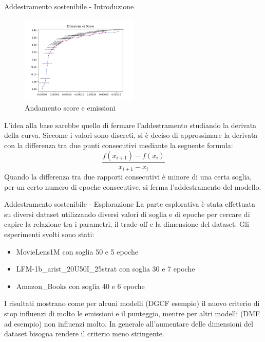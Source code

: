 

\begin{frame}{Addestramento sostenibile - Introduzione}
    \begin{figure}
        \centering
        \includegraphics[width=0.5\textwidth]{images/curve_emissions_score.png}
        \caption{Andamento score e emissioni}
    \end{figure}
    \small    
    L'idea alla base sarebbe quello di fermare l'addestramento studiando la derivata della curva. Siccome i valori sono discreti, si è deciso di approssimare la derivata con la differenza tra due punti consecutivi mediante la seguente formula:
\begin{equation*}
    \frac{f(x_{i+1}) - f(x_i)}{x_{i+1} - x_i}
\end{equation*}
Quando la differenza tra due rapporti consecutivi è minore di una certa soglia, per un certo numero di epoche consecutive, si ferma l’addestramento del modello.
\end{frame}

\begin{frame}{Addestramento sostenibile - Esplorazione}
    La parte esplorativa è stata effettuata su diversi dataset utilizzando diversi valori di soglia e di epoche per cercare di capire la relazione tra i parametri, il trade-off e la dimensione del dataset. Gli esperimenti svolti sono stati:
    \begin{itemize}
        \item MovieLens1M con soglia 50 e 5 epoche
        \item LFM-1b\_arist\_20U50I\_25strat con soglia 30 e 7 epoche
        \item Amazon\_Books con soglia 40 e 6 epoche
    \end{itemize}
I risultati mostrano come per alcuni modelli (DGCF esempio) il nuovo criterio di stop influenzi di molto le emissioni e il punteggio, mentre per altri modelli (DMF ad esempio) non influenzi molto.
In generale all'aumentare delle dimensioni del dataset bisogna rendere il criterio meno stringente.
\end{frame}

